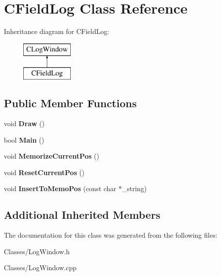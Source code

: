 \hypertarget{class_c_field_log}{}\section{C\+Field\+Log Class Reference}
\label{class_c_field_log}
Inheritance diagram for C\+Field\+Log\+:\begin{figure}[H]
\begin{center}
\leavevmode
\includegraphics[height=2.000000cm]{class_c_field_log}
\end{center}
\end{figure}
\subsection*{Public Member Functions}
\begin{DoxyCompactItemize}
\item 
void {\bfseries Draw} ()\hypertarget{class_c_field_log_a9d5a6bc051de88cb011e92c61f71b1c8}{}\label{class_c_field_log_a9d5a6bc051de88cb011e92c61f71b1c8}

\item 
bool {\bfseries Main} ()\hypertarget{class_c_field_log_ab70929d9ae3f309979c464ffb51e63f9}{}\label{class_c_field_log_ab70929d9ae3f309979c464ffb51e63f9}

\item 
void {\bfseries Memorize\+Current\+Pos} ()\hypertarget{class_c_field_log_a977e85d9a3bf761bacca5f4a6a32fb16}{}\label{class_c_field_log_a977e85d9a3bf761bacca5f4a6a32fb16}

\item 
void {\bfseries Reset\+Current\+Pos} ()\hypertarget{class_c_field_log_a19044cb2e8de33f198668395fff44800}{}\label{class_c_field_log_a19044cb2e8de33f198668395fff44800}

\item 
void {\bfseries Insert\+To\+Memo\+Pos} (const char $\ast$\+\_\+string)\hypertarget{class_c_field_log_a3fb2407f1cefa14beab21e1af8ed2027}{}\label{class_c_field_log_a3fb2407f1cefa14beab21e1af8ed2027}

\end{DoxyCompactItemize}
\subsection*{Additional Inherited Members}


The documentation for this class was generated from the following files\+:\begin{DoxyCompactItemize}
\item 
Classes/Log\+Window.\+h\item 
Classes/Log\+Window.\+cpp\end{DoxyCompactItemize}
